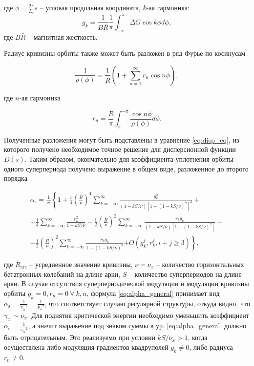 \noindent где $\phi=\frac{2\pi}{L_s}s$ -- угловая продольная координата, $k$-ая гармоника:
\begin{equation}
g_k=\frac{1}{B\bar{R}} \frac{1}{\pi} \int_{-\pi}^\pi \Delta G \cos k \phi d \phi,
\end{equation}
\noindent где $B\bar{R}$ -- магнитная жесткость.

\noindent Радиус кривизны орбиты также может быть разложен в ряд Фурье по косинусам

\begin{equation}
\frac{1}{\rho(\phi)}=\frac{1}{\bar{R}}\left(1+\sum_{n=1}^{\infty} r_n \cos n \phi\right),
\end{equation}

\noindent где $n$-ая гармоника

\begin{equation}
r_n=\frac{\bar{R}}{\pi} \int_\pi^{-\pi} \frac{\cos n \phi}{\rho(\phi)} d \phi.
\end{equation}

\noindent Полученные разложения могут быть подставлены в уравнение \ref{eq:disp_eq}, из которого получено необходимое точное решение для дисперсионной функции $D(s)$. Таким образом, окончательно для коэффициента уплотнения орбиты одного суперпериода получено выражение в общем виде, разложенное до второго порядка

\begin{equation}
\begin{gathered}
\alpha_{\text{s}}=\frac{1}{\nu^2}\left\{1+\frac{1}{4}\left(\frac{\bar{R}}{\nu}\right)^4 \sum_{k=-\infty}^{\infty}\right.
\frac{g_k^2}{(1-k S / \nu)\left[1-(1-k S / \nu)^2\right]^2}+ \\
+\frac{1}{4} \sum_{k=-\infty}^{\infty} \frac{r_k^2}{1-k S / \nu} -\frac{1}{2}\left(\frac{\bar{R}}{\nu}\right)^2 \sum_{k=-\infty}^{\infty} \frac{r_k g_k}{(1-k S / \nu)\left[1-(1-k S / \nu)^2\right]} - \\
-\frac{1}{2}\left(\frac{\bar{R}}{\nu}\right)^2 \sum_{k=-\infty}^{\infty} \frac{r_k g_k}{1-(1-k S / \nu)^2}
\left.+O\left(g_k^i, r_k^j, i+j \geq 3\right)\right\},
\end{gathered}
\label{eq:alpha_general}
\end{equation}

\noindent где ${\overline{R}}_{\text{arc}}$ -- усредненное значение кривизны, $\nu=\nu_{x}$ -- количество горизонтальных бетатронных колебаний на длине арки, $S$ -- количество суперпериодов на длине арки. В случае отсутствия суперпериодической модуляции и модуляции кривизны орбиты $g_k=0, r_n=0 \  \forall~k, n$, формула \ref{eq:alpha_general} принимает вид $\alpha_{\text{s}}=\frac{1}{{\gamma_{\text{tr}}}^2}=\frac{1}{{\nu_x}^2}$, что соответствует случаю регулярной структуры, откуда видно, что $\gamma_{\text{tr}}\sim\nu_x$. Для поднятия критической энергии необходимо уменьшить коэффициент $\alpha_{\text{s}}=\frac{1}{{\gamma_{\text{tr}}}^2}$, а значит выражение под знаком суммы в ур. \ref{eq:alpha_general} должно быть отрицательным. Это реализуемо при условии $kS/\nu_{x}>1$, когда осуществлена либо модуляция градиентов квадруполей $g_k\not=0$, либо радиуса $r_n\not=0$.

